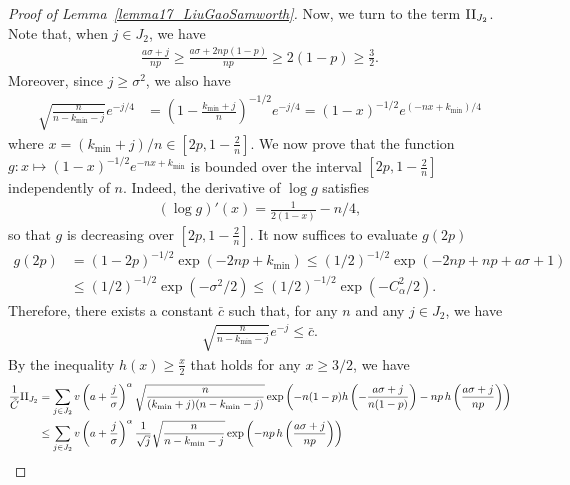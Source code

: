 \documentclass{article}
\begin{document}
\begin{proof}[Proof of Lemma~\ref{lemma17_LiuGaoSamworth}]
Now, we turn to the term $\text{I\hspace{.2mm}I}_{J_2}$. 
Note that, when $j \in J_2$, 
we have
\begin{align*}
    \frac{a\sigma + j}{np} \geq \frac{a\sigma + 2np(1-p)}{np} \geq 2(1-p) \geq \frac{3}{2}.
\end{align*}
Moreover, since $j \geq \sigma^2$, we also have
\begin{align*}
    \sqrt{\frac{n}{n-k_{\min} - j}} e^{-j/4} &= \left(1 - \frac{k_{\min} + j}{ n}\right)^{-1/2} e^{-j/4} = \left(1-x\right)^{-1/2} e^{(-nx + k_{\min})/4}
\end{align*}
where $x = (k_{\min}+j)/n \in [ 2p, 1 - \frac{2}{n}]$. 
We now prove that the function $g: x \mapsto \left(1-x\right)^{-1/2} e^{-nx + k_{\min}}$ is bounded over the interval $[2p,1-\frac{2}{n}]$ independently of $n$. 
Indeed, the derivative of $\log g$ satisfies
\begin{align*}
    (\log g)'(x) = \frac{1}{2(1-x)} - n/4,
\end{align*}
so that $g$ is decreasing over $[2 p, 1-\frac{2}{n}]$. 
It now suffices to evaluate $g(2p)$
\begin{align*}
    g(2p) &= \left(1 - 2p \right)^{-1/2} \exp\left(-2n p + k_{\min}\right) \leq \left(1/2 \right)^{-1/2} \exp\left(-2n p + np + a\sigma + 1\right)\\
    & \leq \left(1/2 \right)^{-1/2} \exp\left(-\sigma^2/2 \right) \leq \left(1/2 \right)^{-1/2} \exp\left(-C_\alpha^2/2 \right).
\end{align*}
Therefore, there exists a constant $\bar c$ such that, for any $n$ and any $j \in J_2$, we have
\begin{align*}
    \sqrt{\frac{n}{n-k_{\min} - j}} e^{-j} \leq \bar c.
\end{align*}
By the inequality $h(x) 
 \geq \frac{x}{2}$ 
that holds for any $x \geq 3/2$, we have
\begin{align*}
    \frac{1}{\tilde C}\text{I\hspace{.2mm}I}_{J_2} &= \sum_{j\in J_2}v\left(a +\frac{j}{\sigma}\right)^\alpha \sqrt{\frac{n}{(k_{\min} + j)(n-k_{\min} - j)}} \exp\left(-n(1-p) h\left(-\frac{a\sigma + j}{n(1-p)}\right) - np \, h\left(\frac{a\sigma + j}{np}\right)\right)\\
    & \leq \sum_{j\in J_2}v\left(a+\frac{j}{\sigma}\right)^\alpha \frac{1}{ \sqrt{j}} \sqrt{\frac{n}{n-k_{\min} - j}}\exp\left(- np \, h\left(\frac{a\sigma + j}{np}\right)\right)\\

\end{align*}
\end{proof}
\end{document}
